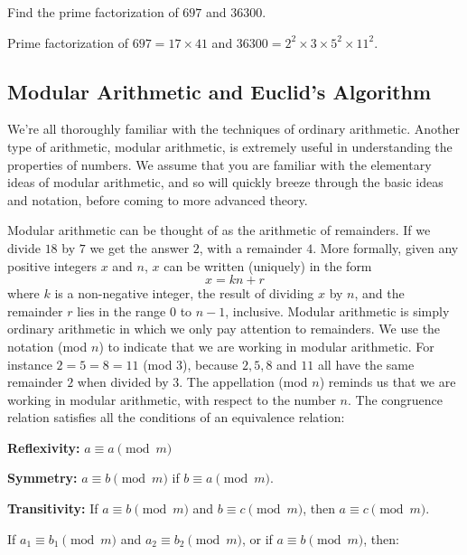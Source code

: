 \begin{example}
    Find the prime factorization of $697$ and $36300$.

    Prime factorization of $697=17\times 41$ and $36300 = 2^2\times 3\times 5^2 \times 11^2$.
\end{example}
\subsection{Modular Arithmetic and Euclid's Algorithm}
We're all thoroughly familiar with the techniques of ordinary arithmetic. Another type of arithmetic, modular arithmetic, is extremely useful in understanding the properties of numbers. We assume that you are familiar with the elementary ideas of modular arithmetic, and so will quickly breeze through the basic ideas and notation, before coming to more advanced theory.

Modular arithmetic can be thought of as the arithmetic of remainders. If we divide $18$ by $7$ we get the answer $2$, with a remainder $4$. More formally, given any positive integers $x$ and $n$, $x$ can be written (uniquely) in the form
\[
x=kn+r
\]
where $k$ is a non-negative integer, the result of dividing $x$ by $n$, and the remainder $r$ lies in the range $0$ to $n-1$, inclusive. Modular arithmetic is simply ordinary arithmetic in which we only pay attention to remainders. We use the notation (mod $n$) to indicate that we are working in modular arithmetic. For instance $2=5=8=11$ (mod $3$), because $2,5,8$ and $11$ all have the same remainder $2$ when divided by $3$. The appellation (mod $n$) reminds us that we are working in modular arithmetic, with respect to the number $n$.
The congruence relation satisfies all the conditions of an equivalence relation:

\textbf{Reflexivity:} \( a \equiv a \pmod{m} \)

\textbf{Symmetry:} \( a \equiv b \pmod{m} \) if \( b \equiv a \pmod{m} \).

\textbf{Transitivity:} If \( a \equiv b \pmod{m} \) and \( b \equiv c \pmod{m} \), then \( a \equiv c \pmod{m} \).

If \( a_1 \equiv b_1 \pmod{m} \) and \( a_2 \equiv b_2 \pmod{m} \), or if \( a \equiv b \pmod{m} \), then:

